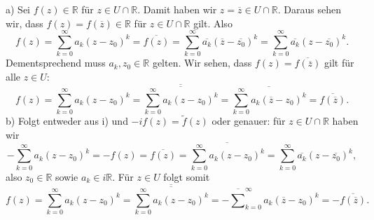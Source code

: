 \documentclass[11pt,a4paper]{article}
\theoremstyle{definition} \newtheorem{theo}{Theorem}[section]
\theoremstyle{definition} \newtheorem{defi}{Definition}[section]
\theoremstyle{definition} \newtheorem{cor}{Corollary}[section]
\theoremstyle{definition} \newtheorem{lemmas}{Lemma}[section]
\theoremstyle{definition} \newtheorem{assp}{Assumption}[section]
\theoremstyle{definition} \newtheorem{exam}{Example}[section]
\theoremstyle{definition} \newtheorem{sol}{Lösung}
\begin{document}
a) Sei $f(z)\in \mathbb{R}$ für $z\in U\cap \mathbb{R}$. Damit haben wir $z=\overline{z}\in U\cap \mathbb{R}$. Daraus sehen wir, dass $f(z)=f(\overline{z})\in \mathbb{R}$ für $z\in U\cap \mathbb{R}$ gilt. Also
\begin{equation*}
f(z)=\sum_{k=0}^{\infty}a_{k}(z-z_{0})^{k}=\overline{f(z)}=\sum_{k=0}^{\infty}\overline{a_{k}}(\overline{z}-\overline{z_{0}})^k=\sum_{k=0}^{\infty}\overline{a_{k}}(z-\overline{z_{0}})^k.
\end{equation*}
Dementsprechend muss $a_{k},z_{0}\in \mathbb{R}$ gelten. Wir sehen, dass $f(z)= \overline{f(\overline{z})}$ gilt für alle $z\in U$:
\begin{equation*}
f(z)=\sum_{k=0}^{\infty}a_{k}(z-z_{0})^{k}=\overline{\overline{\sum_{k=0}^{\infty}a_{k}(z-z_{0})^{k}}}=\overline{\sum_{k=0}^{\infty}a_{k}(\overline{z}-z_{0})^{k}}=\overline{f(\overline{z})}.
\end{equation*}
b) Folgt entweder aus i) und $-if(z)=\tilde{f}(z)$ oder genauer: für $z\in U\cap \mathbb{R}$ haben wir
\begin{equation*}
-\sum_{k=0}^{\infty}a_{k}(z-z_{0})^{k}=-f(z)=\overline{f(z)}=\overline{\sum_{k=0}^{\infty}a_{k}(z-z_{0})^{k}}= \sum_{k=0}^{\infty}\overline{a_{k}}(z-\overline{z_{0}})^{k},
\end{equation*}
also $z_{0}\in\mathbb{R}$ sowie $a_{k}\in i\mathbb{R}$. Für $z\in U$ folgt somit
\begin{equation*}
f(z)=\sum_{k=0}^{\infty}a_{k}(z-z_{0})^{k}=\overline{\overline{\sum_{k=0}^{\infty}a_{k}(z-z_{0})^{k}}}=-\overline \sum_{k=0}^{\infty}a_{k}(\overline{z}-z_{0})^{k}=-\overline{f(\overline{z})}.
\end{equation*}
\end{document}
